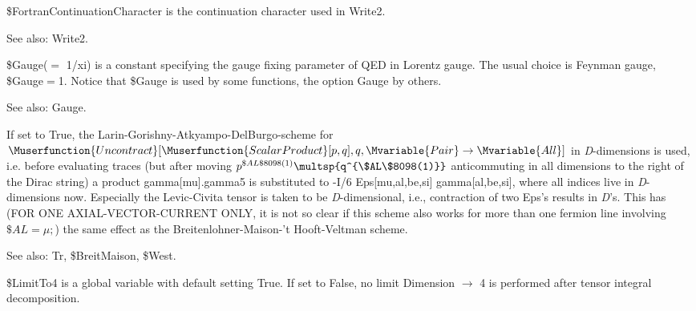 

\${}FortranContinuationCharacter is the continuation character used in Write2.



See also:  Write2.



\${}Gauge(\(=\) 1/xi) is a constant specifying the gauge fixing parameter of QED in Lorentz gauge. { }The usual choice is Feynman gauge,
  \${}Gauge\(=\)1. Notice that \${}Gauge is used by some functions, the option Gauge by others.

See also:  Gauge.



If set to True, the Larin-Gorishny-Atkyampo-DelBurgo-scheme for \(\Muserfunction{Uncontract}[\Muserfunction{ScalarProduct}[p,q],q,\Mvariable{Pair}\rightarrow
\Mvariable{All}]\) in {\itshape D}-dimensions is used, i.e. before evaluating traces (but after moving \({p^{\$AL\$8098(1)}}\multsp
{q^{\$AL\$8098(1)}}\) anticommuting in all dimensions to the right of the Dirac string) a product { }gamma[mu].gamma5 is substituted
to { }-I/6
  Eps[mu,al,be,si] gamma[al,be,si], where all indices live in {\itshape D}-dimensions now. Especially the Levic-Civita tensor is taken to be {\itshape
D}-dimensional, i.e., contraction of two Eps's results in {\itshape D}'s. This has (FOR ONE AXIAL-VECTOR-CURRENT ONLY, it is not so clear if this
scheme also works for more than one fermion line involving \(\$AL=\mu ;\)) the same effect as the Breitenlohner-Maison-'t Hooft-Veltman scheme.



See also: { }Tr, \${}BreitMaison, \${}West.



\${}LimitTo4 is a global variable with default setting True. If set to False, no limit Dimension \(\rightarrow \) 4 is performed after
  tensor integral decomposition.

